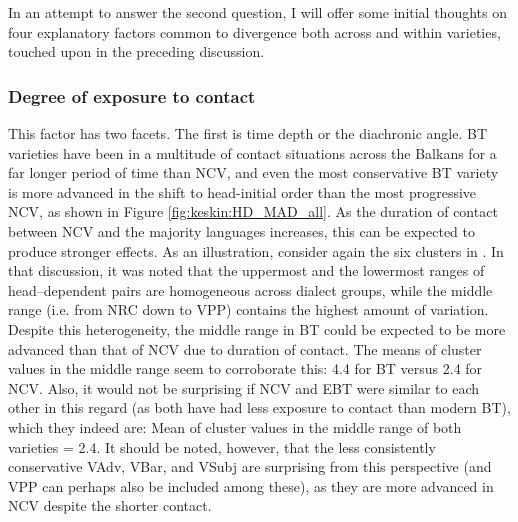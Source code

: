 \documentclass[output=paper,colorlinks,citecolor=brown]{langscibook}
\begin{document}
In an attempt to answer the second question, I will offer some initial thoughts on four explanatory factors common to divergence both across and within varieties, touched upon in the preceding discussion.

\subsubsection{Degree of exposure to contact} 

This factor has two facets. The first is time depth or the diachronic angle. BT varieties have been in a multitude of contact situations across the Balkans for a far longer period of time than NCV, and even the most conservative BT variety is more advanced in the shift to head-initial order than the most progressive NCV, as shown in Figure \ref{fig:keskin:HD_MAD_all}. As the duration of contact between NCV and the majority languages increases, this can be expected to produce stronger effects. As an illustration, consider again the six clusters in . In that discussion, it was noted that the uppermost and the lowermost ranges of head--dependent pairs are homogeneous across dialect groups, while the middle range (i.e. from NRC down to VPP) contains the highest amount of variation. Despite this heterogeneity, the middle range in BT could be expected to be more advanced than that of NCV due to duration of contact. The means of cluster values in the middle range seem to corroborate this: 4.4 for BT versus 2.4 for NCV. Also, it would not be surprising if NCV and EBT were similar to each other in this regard (as both have had less exposure to contact than modern BT), which they indeed are: Mean of cluster values in the middle range of both varieties = 2.4. It should be noted, however, that the less consistently conservative VAdv, VBar, and VSubj are surprising from this perspective (and VPP can perhaps also be included among these), as they are more advanced in NCV despite the shorter contact.
\end{document}
